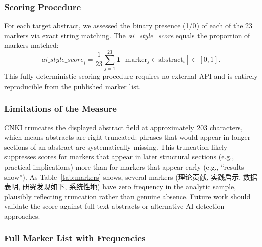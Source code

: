 \documentclass[12pt,a4paper]{article}
\begin{document}
\subsubsection*{Scoring Procedure}

For each target abstract, we assessed the binary presence (1/0) of
each of the 23 markers via exact string matching.
The \textit{ai\_style\_score} equals the proportion of markers matched:
\[
  \textit{ai\_style\_score}_i
    = \frac{1}{23}\sum_{j=1}^{23} \mathbf{1}[\text{marker}_j \in \text{abstract}_i]
  \in [0,1].
\]
This fully deterministic scoring procedure requires no external API
and is entirely reproducible from the published marker list.

\subsubsection*{Limitations of the Measure}

CNKI truncates the displayed abstract field at approximately 203 characters,
which means abstracts are right-truncated: phrases that would appear in
longer sections of an abstract are systematically missing.
This truncation likely suppresses scores for markers that appear in
later structural sections (e.g., practical implications) more than for
markers that appear early (e.g., ``results show'').
As Table~\ref{tab:markers} shows, several markers (理论贡献,
实践启示, 数据表明, 研究发现如下, 系统性地) have zero frequency in
the analytic sample, plausibly reflecting truncation rather than
genuine absence.
Future work should validate the score against full-text abstracts or
alternative AI-detection approaches.

\subsubsection*{Full Marker List with Frequencies}
\end{document}

